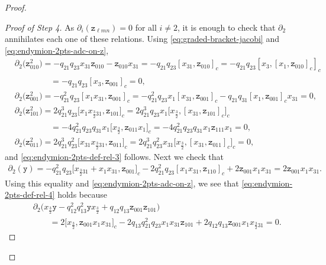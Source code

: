 \documentclass[pdftex]{sigma}
\numberwithin{equation}{section}
\newcommand{\yt}{\mathtt{y}}
\newcommand{\zt}{\mathtt{z}}
\newcommand{\tresdos}{\frac{3}{2}}
\begin{document}
\begin{proof}
\begin{proof}[Proof of Step 4]
As $\partial_i(\zt_{\ell mn})=0$ for all $i\ne 2$, it is enough to check that $\partial_2$ annihilates each one of these relations. Using \eqref{eq:graded-bracket-jacobi} and \eqref{eq:endymion-2pts-adc-on-z},
\begin{align*}
&\partial_2 \big(\zt_{010}^2\big) = -q_{21}q_{23}x_{31}\zt_{010}-\zt_{010}x_{31}
= -q_{21}q_{23}[x_{31}, \zt_{010}]_c
= -q_{21}q_{23}[x_{3}, [x_1,\zt_{010}]_c]_c
\\ &\phantom{\partial_2 (\zt_{010}^2)}
= -q_{21}q_{23}[x_{3}, \zt_{001}]_c =0,
\\
&\partial_2 \big(\zt_{001}^2\big) = -q_{21}^2q_{23}[x_1x_{31}, \zt_{001}]_c
=-q_{21}^2q_{23}x_1[x_{31}, \zt_{001}]_c-q_{21}q_{31}[x_1, \zt_{001}]_cx_{31}=0,
\\
&\partial_2 \big(\zt_{101}^2\big) = 2q_{21}^3q_{23}\big[x_1x_{\tresdos31}, \zt_{101}\big]_c
= 2q_{21}^3q_{23}x_1\big[x_{\tresdos}, [x_{31},\zt_{101}]_c\big]_c
\\&\phantom{\partial_2 (\zt_{101}^2)}
=-4q_{21}^2q_{23}q_{31} x_1\big[x_{\tresdos}, \zt_{011}x_1\big]_c=-4q_{21}^2q_{23}q_{31} x_1\zt_{111}x_1=0,
\\
&\partial_2 \big(\zt_{011}^2\big) = 2q_{21}^3q_{23}^2\big[x_{31}x_{\tresdos31}, \zt_{011}\big]_c
= 2q_{21}^3q_{23}^2x_{31}\big[x_{\tresdos}, [x_{31},\zt_{011}]_c\big]_c=0,
\end{align*}
and \eqref{eq:endymion-2pts-def-rel-3} follows. Next we check that
\begin{align*}
\partial_2 (\yt) = -q_{21}^2q_{23} \big[x_{\tresdos31}+x_1x_{31},\zt_{001}\big]_c-2q_{21}^2q_{23} [x_1x_{31},\zt_{110}]_c+2\zt_{001}x_1x_{31}
 =2\zt_{001}x_1x_{31}.
\end{align*}
Using this equality and \eqref{eq:endymion-2pts-adc-on-z}, we see that \eqref{eq:endymion-2pts-def-rel-4} holds because
\begin{align*}
&\partial_{2} \big(x_{\tresdos}\yt -q_{12}^2q_{13}^2\yt x_{\tresdos}+q_{12}q_{13}\zt_{001}\zt_{101}\big)
\\
&\qquad{}= 2\big[x_{\tresdos}, \zt_{001}x_1x_{31}\big]_c
-2q_{13}q_{21}^2q_{23}x_1x_{31}\zt_{101}+2q_{12}q_{13}\zt_{001} x_1x_{\tresdos31}=0.\tag*{\qed}
\end{align*}
\renewcommand{\qed}{}
\end{proof}




\end{proof}
\end{document}
